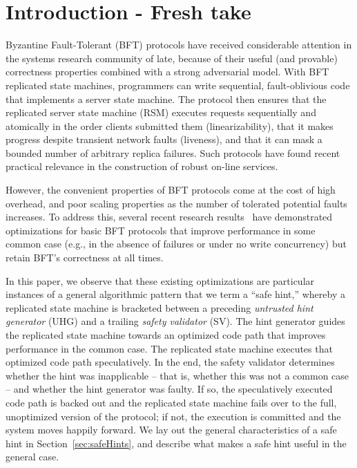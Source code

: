 \documentclass[twocolumn,10pt]{article}
\begin{document}




\section{Introduction - Fresh take}

Byzantine Fault-Tolerant (BFT) protocols have 
received considerable attention in the systems research community of
late, because of their useful (and provable) correctness
properties combined with a strong adversarial model. 
With BFT replicated state machines, programmers can write
sequential, fault-oblivious code that implements a server state
machine. The protocol then ensures that the replicated server state
machine (RSM) executes requests sequentially and atomically
in the order clients submitted them (linearizability), that it makes progress despite transient
network faults (liveness), and that it can mask a bounded number
of arbitrary replica failures.  Such protocols have found recent
practical relevance in the construction of robust on-line services.     

However, the convenient properties of BFT protocols come at the cost
of high overhead, and poor scaling properties as the number of
tolerated potential faults increases.  To address this, several recent
research results~\cite{Castro1999,fault-scalable-sosp-05,
hq-replication-osdi-06} have demonstrated optimizations for basic BFT
protocols that improve performance in some common case (e.g., 
in the absence of failures or under no write concurrency) but retain
BFT's correctness at all times.

In this paper, we observe that these existing
optimizations are particular instances of a general algorithmic 
pattern that we term a ``safe hint,'' whereby a replicated state 
machine is bracketed between a preceding \emph{untrusted hint generator}
(UHG) and a trailing \emph{safety validator} (SV).  The hint generator
guides the replicated state machine towards an optimized code path that
improves performance in the common case.  The replicated state machine
executes that optimized code path speculatively. In the end, the safety
validator determines whether the hint was inapplicable -- that is, whether
this was not a common case -- and whether the hint generator was
faulty.  If so, the speculatively executed code path is backed out and the
replicated state machine fails over to the full, unoptimized version of
the protocol; if not, the execution is committed and the system moves
happily forward.  We lay out the general characteristics of a safe hint
in Section~\ref{sec:safeHints}, and describe what makes a safe hint
useful in the general case.
\end{document}
